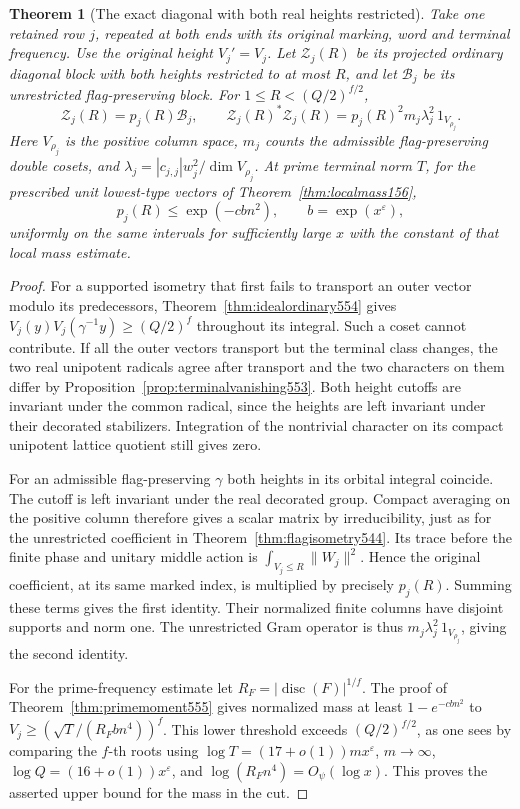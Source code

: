 \documentclass[a4paper,11pt]{article}
\newtheorem{theorem}[proposition]{Theorem}
\theoremstyle{definition}
\theoremstyle{remark}
\numberwithin{equation}{section}
\begin{document}
\begin{theorem}[The exact diagonal with both real heights restricted]
\leavevmode\label{thm:exactcore592}
Take one retained row \(j\), repeated at both ends with its
original marking, word and terminal frequency. Use the
original height \(V_j'=V_j\). Let \(\mathcal Z_j(R)\) be its
projected ordinary diagonal block with both heights restricted
to at most \(R\), and let \(\mathcal B_j\) be its unrestricted
flag-preserving block. For \(1\le R<(Q/2)^{f/2}\),
\[
       \mathcal Z_j(R)=p_j(R)\mathcal B_j,\qquad
       \mathcal Z_j(R)^*\mathcal Z_j(R)
                  =p_j(R)^2m_j\lambda_j^2\,1_{V_{\rho_j}} .
\]
Here \(V_{\rho_j}\) is the positive column space,
\(m_j\) counts the admissible flag-preserving double cosets,
and \(\lambda_j=|c_{j,j}|w_j^2/\dim V_{\rho_j}\).
At prime terminal norm \(T\), for the prescribed unit
lowest-type vectors of Theorem~\ref{thm:localmass156},
\[
           p_j(R)\le \exp(-c b n^2),\qquad b=\exp(x^\varepsilon),
\]
uniformly on the same intervals for sufficiently large \(x\)
with the constant of that local mass estimate.
\end{theorem}
\begin{proof}
For a supported isometry that first fails to transport an
outer vector modulo its predecessors,
Theorem~\ref{thm:idealordinary554} gives
\(V_j(y)V_j(\gamma^{-1}y)\ge(Q/2)^f\) throughout its
integral. Such a coset cannot contribute. If all the outer
vectors transport but the terminal class changes, the two
real unipotent radicals agree after transport and the two
characters on them differ by
Proposition~\ref{prop:terminalvanishing553}. Both height
cutoffs are invariant under the common radical, since the
heights are left invariant under their decorated stabilizers.
Integration of the nontrivial character on its compact
unipotent lattice quotient still gives zero.

For an admissible flag-preserving \(\gamma\) both heights
in its orbital integral coincide. The cutoff is left
invariant under the real decorated group. Compact averaging
on the positive column therefore gives a scalar matrix by
irreducibility, just as for the unrestricted coefficient
in Theorem~\ref{thm:flagisometry544}. Its trace before
the finite phase and unitary middle action is
\(\int_{V_j\le R}\|W_j\|^2\). Hence the original coefficient,
at its same marked index, is multiplied by precisely
\(p_j(R)\). Summing these terms gives the first identity.
Their normalized finite columns have disjoint supports and
norm one. The unrestricted Gram operator is thus
\(m_j\lambda_j^2\,1_{V_{\rho_j}}\), giving the second identity.

For the prime-frequency estimate let
\(R_F=|\operatorname{disc}(F)|^{1/f}\).
The proof of Theorem~\ref{thm:primemoment555} gives
normalized mass at least \(1-e^{-c b n^2}\) to
\(V_j\ge(\sqrt T/(R_F b n^4))^f\). This lower threshold
exceeds \((Q/2)^{f/2}\), as one sees by comparing the
\(f\)-th roots using
\(\log T=(17+o(1))m x^\varepsilon\), \(m\to\infty\),
\(\log Q=(16+o(1))x^\varepsilon\), and
\(\log(R_F n^4)=O_\psi(\log x)\).
This proves the asserted upper bound for the mass in the cut.
\end{proof}
\end{document}
